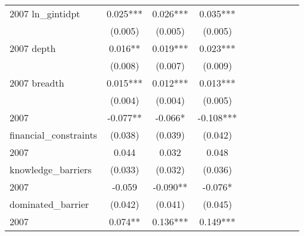 \begin{table}[htbp]
\begin{tabular}{l*{9}{c}}
2007 ln\_gintidpt    &       0.025***&       0.026***&       0.035***&               &               &               &               &               &               \\
                    &     (0.005)   &     (0.005)   &     (0.005)   &               &               &               &               &               &               \\
2007 depth          &       0.016** &       0.019***&       0.023***&               &               &               &               &               &               \\
                    &     (0.008)   &     (0.007)   &     (0.009)   &               &               &               &               &               &               \\
2007 breadth        &       0.015***&       0.012***&       0.013***&               &               &               &               &               &               \\
                    &     (0.004)   &     (0.004)   &     (0.005)   &               &               &               &               &               &               \\
2007                &      -0.077** &      -0.066*  &      -0.108***&               &               &               &               &               &               \\
financial\_constraints&     (0.038)   &     (0.039)   &     (0.042)   &               &               &               &               &               &               \\
2007                &       0.044   &       0.032   &       0.048   &               &               &               &               &               &               \\
knowledge\_barriers  &     (0.033)   &     (0.032)   &     (0.036)   &               &               &               &               &               &               \\
2007                &      -0.059   &      -0.090** &      -0.076*  &               &               &               &               &               &               \\
dominated\_barrier   &     (0.042)   &     (0.041)   &     (0.045)   &               &               &               &               &               &               \\
2007                &       0.074** &       0.136***&       0.149***&               &               &               &               &               &               \\

\end{tabular}
\end{table}
